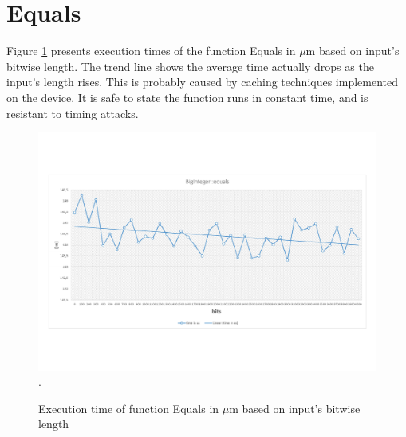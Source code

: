 \documentclass[oneside,openright,12pt,final,en]{mgr}
\begin{document}
\section{Equals}
Figure \ref{fig:equals} presents execution times of the function Equals in $\mu$m based on input's bitwise length. The trend line shows the average time actually drops as the input's length rises. This is probably caused by caching techniques implemented on the device. It is safe to state the function runs in constant time, and is resistant to timing attacks. 
\begin{figure}[H]
	\centering
	\includegraphics[width=\textwidth,trim={0 2.5cm 0 2.5cm},clip]{equals.pdf}.
	\caption{Execution time of function Equals in $\mu$m based on input's bitwise length}
	\label{fig:equals}
\end{figure}





 \listoffigures
 \listoftables
\end{document}
